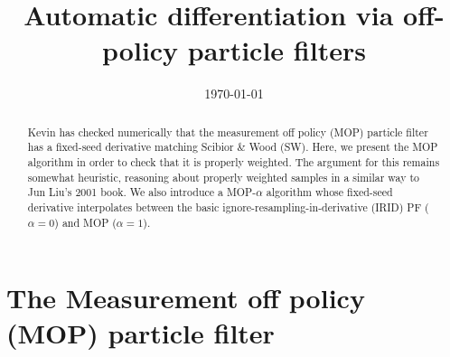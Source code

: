 \documentclass[12p]{article}
\begin{document}
\title{Automatic differentiation via off-policy particle filters}
\date{\today}
\maketitle

\begin{abstract}
Kevin has checked numerically that the measurement off policy (MOP) particle filter has a fixed-seed derivative matching Scibior \& Wood (SW). 
Here, we present the MOP algorithm in order to check that it is properly weighted.
The argument for this remains somewhat heuristic, reasoning about properly weighted samples in a similar way to Jun Liu's 2001 book.
We also introduce a MOP-$\alpha$ algorithm whose fixed-seed derivative interpolates between the basic ignore-resampling-in-derivative (IRID) PF ($\alpha=0$) and 
MOP ($\alpha=1$).
\end{abstract}

\section{The Measurement off policy (MOP) particle filter}
\end{document}
